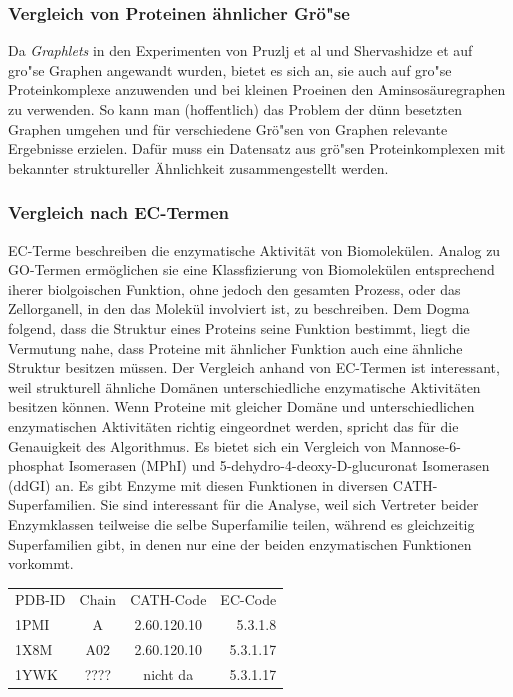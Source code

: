 \documentclass{report}
\begin{document}
\subsubsection{Vergleich von Proteinen \"ahnlicher Gr\"o"se}

Da \textit{Graphlets} in den Experimenten von Pruzlj et al und Shervashidze et auf gro"se Graphen angewandt wurden, bietet es sich an, sie auch auf gro"se Proteinkomplexe anzuwenden und bei kleinen Proeinen den Aminsos\"auregraphen zu verwenden. So kann man (hoffentlich) das Problem der d\"unn besetzten Graphen umgehen und f\"ur verschiedene Gr\"o"sen von Graphen relevante Ergebnisse erzielen. Daf\"ur muss ein Datensatz aus gr\"o"sen Proteinkomplexen mit bekannter struktureller \"Ahnlichkeit zusammengestellt werden.

\subsubsection{Vergleich nach EC-Termen}

EC-Terme beschreiben die enzymatische Aktivit\"at von Biomolek\"ulen. Analog zu GO-Termen erm\"oglichen sie eine Klassfizierung von Biomolek\"ulen entsprechend iherer biolgoischen Funktion, ohne jedoch den gesamten Prozess, oder das Zellorganell, in den das Molek\"ul involviert ist, zu beschreiben. Dem Dogma folgend, dass die Struktur eines Proteins seine Funktion bestimmt, liegt die Vermutung nahe, dass Proteine mit \"ahnlicher Funktion auch eine \"ahnliche Struktur besitzen m\"ussen. Der Vergleich anhand von EC-Termen ist interessant, weil strukturell \"ahnliche Dom\"anen unterschiedliche enzymatische Aktivit\"aten besitzen k\"onnen. Wenn Proteine mit gleicher Dom\"ane und unterschiedlichen enzymatischen Aktivit\"aten richtig eingeordnet werden, spricht das f\"ur die Genauigkeit des Algorithmus. Es bietet sich ein Vergleich von Mannose-6-phosphat Isomerasen (MPhI) und 5-dehydro-4-deoxy-D-glucuronat Isomerasen (ddGI) an. Es gibt Enzyme mit diesen Funktionen in diversen CATH-Superfamilien. Sie sind interessant f\"ur die Analyse, weil sich Vertreter beider Enzymklassen teilweise die selbe Superfamilie teilen, w\"ahrend es gleichzeitig Superfamilien gibt, in denen nur eine der beiden enzymatischen Funktionen vorkommt.


\begin{tabular}{l c c r}

PDB-ID & Chain & CATH-Code   & EC-Code  \\
1PMI   & A     & 2.60.120.10 & 5.3.1.8  \\
1X8M   & A02   & 2.60.120.10 & 5.3.1.17 \\
1YWK   & ????  & nicht da    & 5.3.1.17

\end{tabular}
\end{document}

